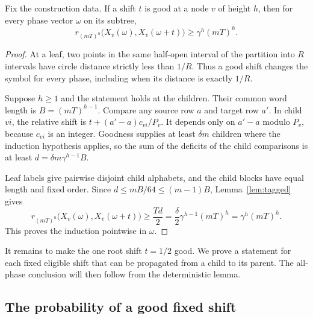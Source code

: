 \begin{lemma}\label{lem:torus-good-separation}
Fix the construction data. If a shift $t$ is good at a node $v$ of
height $h$, then for every phase vector $\omega$ on its subtree,
\[
 r_{(mT)^h}\bigl(X_v(\omega),X_v(\omega+t)\bigr)
 \geq\gamma^h(mT)^h.
\]
\end{lemma}
\begin{proof}
At a leaf, two points in the same half-open interval of the partition
into $R$ intervals have circle distance strictly less than $1/R$.
Thus a good shift changes the symbol for every phase, including when
its distance is exactly $1/R$.

Suppose $h\geq1$ and the statement holds at the children. Their common
word length is $B=(mT)^{h-1}$. Compare any source row $a$ and target
row $a'$. In child $vi$, the relative shift is
$t+(a'-a)c_{vi}/P_v$. It depends only on $a'-a$ modulo $P_v$, because
$c_{vi}$ is an integer. Goodness supplies at least $\delta m$ children
where the induction hypothesis applies, so the sum of the deficits of
the child comparisons is at least
$d=\delta m\gamma^{h-1}B$.

Leaf labels give pairwise disjoint child alphabets, and the child blocks
have equal length and fixed order. Since
$d\leq mB/64\leq(m-1)B$, Lemma~\ref{lem:tagged} gives
\[
 r_{(mT)^h}\bigl(X_v(\omega),X_v(\omega+t)\bigr)
 \geq\frac{Td}{2}
 =\frac{\delta}{2}\gamma^{h-1}(mT)^h
 =\gamma^h(mT)^h.
\]
This proves the induction pointwise in $\omega$.
\end{proof}

It remains to make the one root shift $t=1/2$ good. We prove a statement
for each fixed eligible shift that can be propagated from a child to
its parent. The all-phase conclusion will then follow from the
deterministic lemma.

\subsection{The probability of a good fixed shift}

